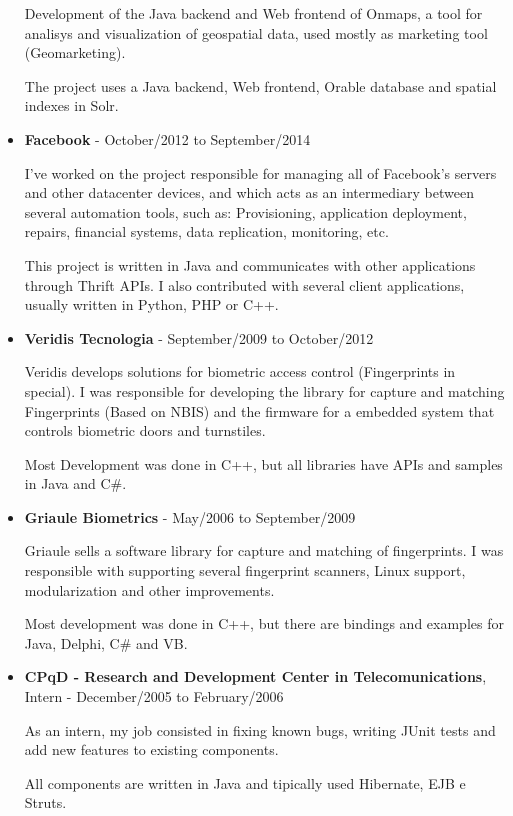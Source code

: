 \documentclass[a4paper,10pt]{article}
\begin{document}
\begin{itemize}
        Development of the Java backend and Web frontend of Onmaps, a tool for analisys and visualization of geospatial data, used mostly as marketing tool (Geomarketing).
        
        The project uses a Java backend, Web frontend, Orable database and spatial indexes in Solr.

      \item
        \textbf{Facebook} - October/2012 to September/2014
        
        I've worked on the project responsible for managing all of Facebook's servers and other datacenter devices, and which acts as an intermediary between several automation tools, such as: Provisioning, application deployment, repairs, financial systems, data replication, monitoring, etc.
        
        This project is written in Java and communicates with other applications through Thrift APIs. I also contributed with several client applications, usually written in Python, PHP or C++.

    
      \item  
        \textbf{Veridis Tecnologia} - September/2009 to October/2012

        Veridis develops solutions for biometric access control (Fingerprints in special). I was responsible for developing the library for capture and  matching Fingerprints (Based on NBIS) and the firmware for a embedded system that controls biometric doors and turnstiles.
        
        Most Development was done in C++, but all libraries have APIs and samples in Java and C\#.

      \item  
        \textbf{Griaule Biometrics} - May/2006 to September/2009

        Griaule sells a software library for capture and matching of fingerprints. I was responsible with supporting several fingerprint scanners, Linux support, modularization and other improvements.
        
        Most development was done in C++, but there are bindings and examples for Java, Delphi, C\# and VB.

      \item
        \textbf{CPqD - Research and Development Center in Telecomunications}, Intern - December/2005 to February/2006

        As an intern, my job consisted in fixing known bugs, writing JUnit tests and add new features to existing components.

        All components are written in Java and tipically used Hibernate, EJB e Struts.
    \end{itemize}
\end{document}
